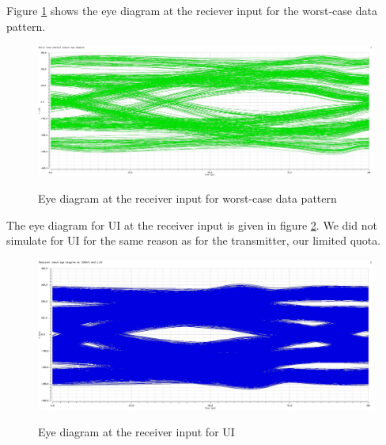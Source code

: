 Figure \ref{fig:rx_inp_wc_eye} shows the eye diagram at the reciever input for the worst-case data pattern.

\begin{figure}[H]
  \centering
  {\includegraphics[scale=0.33]{img/wc_ch_eye.jpg}}
  \caption{Eye diagram at the receiver input for worst-case data pattern}
  \label{fig:rx_inp_wc_eye}
\end{figure}


The eye diagram for \unit[5000]{UI} at the receiver input is given in figure \ref{fig:rx_out_eye}. We did not simulate for \unit[10000]{UI} for the same reason as for the transmitter, our limited quota.

\begin{figure}[H]
  \centering
  {\includegraphics[scale=0.4]{img/eye_rx_10gbs_5000.jpg}}
  \caption{Eye diagram at the receiver input for \unit[5000]{UI}}
  \label{fig:rx_out_eye}
\end{figure}